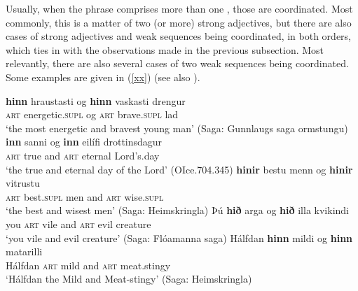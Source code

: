 \documentclass[output=paper,colorlinks,citecolor=brown]{langscibook}
\begin{document}
Usually, when the  phrase comprises more than one , those are coordinated.   Most commonly, this is a matter of two (or more) strong adjectives, but there are also cases of strong adjectives and weak sequences being coordinated, in both orders, which ties in with the observations made in the previous subsection. Most relevantly, there are also several cases of two weak sequences being coordinated. Some examples are given  in (\ref{xx}) (see also \cite[192--193; fn. 36]{Pfaff2019}). %

\begin{exe}
\ex \label{xx}   
    \begin{xlist}
       \ex\gll \textbf{hinn} hraustasti og  \textbf{hinn} vaskasti drengur \\
       \textsc{art} energetic.\textsc{supl} og \textsc{art} brave.\textsc{supl}  lad  \\ 
       \glt `the most energetic and bravest young man'  
       \glt (Saga: Gunnlaugs saga ormstungu)
       \ex \gll  \textbf{inn} sanni og \textbf{inn}  eilífi drottinsdagur \\
       \textsc{art} true and \textsc{art} eternal  {Lord's.day}  \\ 
       \glt `the true and eternal day of the Lord'  (OIce.704.345)
        \ex\gll \textbf{hinir}  bestu  menn og \textbf{hinir} vitrustu  \\ 
        \textsc{art} best.\textsc{supl} men and \textsc{art} wise.\textsc{supl} \\  
        \glt `the best and wisest men'   (Saga: Heimskringla)
        \ex\gll  Þú  \textbf{hið}  arga og \textbf{hið} illa kvikindi \\ 
         you \textsc{art} vile and \textsc{art} evil creature \\
         \glt `you vile and evil creature'   (Saga: Flóamanna saga) 
        \ex\gll  Hálfdan \textbf{hinn} mildi og \textbf{hinn} matarilli \\ 
          Hálfdan \textsc{art} mild and \textsc{art} meat.stingy \\ 
          \glt `Hálfdan the Mild and Meat-stingy'   (Saga: Heimskringla)
\end{xlist} 
\end{exe}
\end{document}
